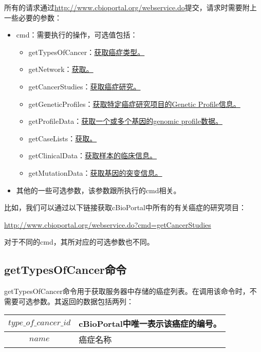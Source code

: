 所有的请求通过\href{http://www.cbioportal.org/webservice.do}{http://www.cbioportal.org/webservice.do}提交，请求时需要附上一些必要的参数：
\begin{itemize}
\item cmd：需要执行的操作，可选值包括：
\begin{itemize}
	\item getTypesOfCancer：\href{http://www.cbioportal.org/webservice.do?cmd=getTypesOfCancer}{获取癌症类型。}
	\item getNetwork：\href{http://www.cbioportal.org/webservice.do?cmd=getNetwork}{获取。}
	\item getCancerStudies：\href{http://www.cbioportal.org/webservice.do?cmd=getCancerStudies}{获取癌症研究。}
	\item getGeneticProfiles：\href{http://www.cbioportal.org/webservice.do?cmd=getGeneticProfiles&cancer_study_id=msk_impact_2017}{获取特定癌症研究项目的Genetic Profile信息。}
	\item getProfileData：\href{http://www.cbioportal.org/webservice.do?cmd=getProfileData&case_set_id=msk_impact_2017_all&genetic_profile_id=msk_impact_2017_mutations&gene_list=p53,kras}{获取一个或多个基因的genomic profile数据。}
	\item getCaseLists：\href{http://www.cbioportal.org/webservice.do?cmd=getCaseLists&cancer_study_id=msk_impact_2017}{获取。}
	\item getClinicalData：\href{http://www.cbioportal.org/webservice.do?cmd=getClinicalData&case_set_id=msk_impact_2017_all}{获取样本的临床信息。}
	\item getMutationData：\href{http://www.cbioportal.org/webservice.do?cmd=getMutationData&genetic_profile_id=msk_impact_2017_mutations&gene_list=p53,kras}{获取基因的突变信息。}
\end{itemize}
\item 其他的一些可选参数，该参数跟所执行的cmd相关。
\end{itemize}
比如，我们可以通过以下链接获取cBioPortal中所有的有关癌症的研究项目：
\centerline{\href{http://www.cbioportal.org/webservice.do?cmd=getCancerStudies}{http://www.cbioportal.org/webservice.do?cmd=getCancerStudies}}

对于不同的cmd，其所对应的可选参数也不同。

\subsection{getTypesOfCancer命令}\label{subsec:getTypesOfCancer}
getTypesOfCancer命令用于获取服务器中存储的癌症列表。在调用该命令时，不需要可选参数。其返回的数据包括两列：
\begin{center}
\begin{tabular}{|c|l|}
\hline
$ type\_of\_cancer\_id $ & cBioPortal中唯一表示该癌症的编号。\\
\hline
$ name $ & 癌症名称 \\
\hline
\end{tabular}
\end{center}


